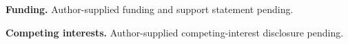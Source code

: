 \begin{ack}
\textbf{Funding.} Author-supplied funding and support statement pending.

\textbf{Competing interests.} Author-supplied competing-interest disclosure pending.
\end{ack}
